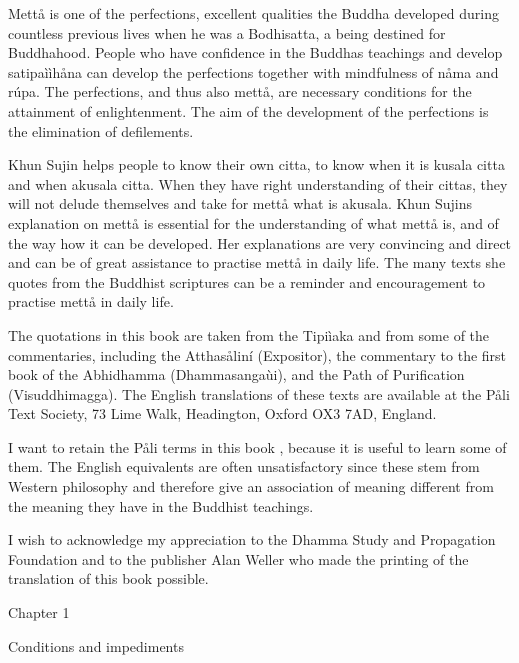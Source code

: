 \documentclass[12pt,twoside]{article}
\begin{document}
Mett{\aa} is one of the
{\textasciigrave}{\textasciigrave}perfections{\textquotesingle}{\textquotesingle},
excellent qualities the Buddha developed during countless previous
lives when he was a Bodhisatta, a being destined for Buddhahood. People
who have confidence in the Buddha{\textquotesingle}s teachings and
develop satipa\`i\`ih{\aa}na can develop the perfections together with
mindfulness of n{\aa}ma and r\'upa. The perfections, and thus also
mett{\aa}, are necessary conditions for the attainment of
enlightenment. The aim of the development of the perfections is the
elimination of defilements. 

Khun Sujin helps people to know their own citta, to know when it is
kusala citta and when akusala citta. When they have right understanding
of their cittas, they will not delude themselves and take for mett{\aa}
what is akusala. Khun Sujin{\textquotesingle}s explanation on mett{\aa}
is essential for the understanding of what mett{\aa} is, and of the way
how it can be developed. Her explanations are very convincing and
direct and can be of great assistance to practise mett{\aa} in daily
life. The many texts she quotes from the Buddhist scriptures can be a
reminder and encouragement to practise mett{\aa} in daily life. 

The quotations in this book are taken from the Tipi\`iaka and from some
of the commentaries, including the Atthas{\aa}lin\'i (Expositor), the
commentary to the first book of the Abhidhamma (Dhammasanga\`ui), and
the Path of Purification (Visuddhimagga). The English translations of
these texts are available at the P{\aa}li Text Society, 73 Lime Walk,
Headington, Oxford OX3 7AD, England. 

I want to retain the P{\aa}li terms in this book , because it is useful
to learn some of them. The English equivalents are often unsatisfactory
since these stem from Western philosophy and therefore give an
association of meaning different from the meaning they have in the
Buddhist teachings. 

I wish to acknowledge my appreciation to the
{\textasciigrave}{\textasciigrave}Dhamma Study and Propagation
Foundation{\textquotesingle}{\textquotesingle} and to the publisher
Alan Weller who made the printing of the translation of this book
possible. 

\clearpage
Chapter 1


\bigskip


\bigskip

Conditions and impediments
\end{document}
